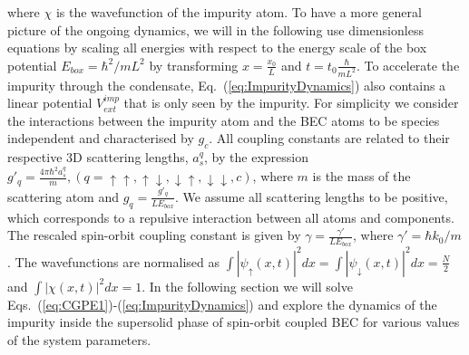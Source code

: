 \documentclass[12pt]{iopart}
\begin{document}
where $\chi$ is the wavefunction  of the impurity atom. To have a more general picture of the ongoing dynamics, we will in the following use dimensionless equations by scaling all energies with respect to the energy scale of the box potential $E_{box}=\hbar^2 /mL^2$ by transforming $x=\frac{x_0}{L}$ and $t = t_0\frac{\hbar}{mL^2}$.
To accelerate the impurity through the condensate, Eq.~(\ref{eq:ImpurityDynamics}) also contains a linear potential $V_{ext}^{imp}$ that is only seen by the impurity. For simplicity we consider the interactions between the impurity atom and the BEC atoms to be species independent and characterised by $g_{c}$. All coupling constants are related to their respective 3D scattering lengths, $a_s^{q}$, by the expression $g'_{q}=\frac{4\pi\hbar^2a_s^{q}}{m}, (q=\uparrow\uparrow,\uparrow\downarrow,\downarrow\uparrow,\downarrow\downarrow,c)$, where $m$ is the mass of the scattering atom and $g_{q}=\frac{g'_{q}}{L E_{{box}}}$. We assume all scattering lengths to be positive, which corresponds to a repulsive interaction between all atoms and components. The rescaled spin-orbit coupling constant is given by $\gamma=\frac{\gamma'}{L E_{box}}$, where $\gamma'=\hbar k_0/m$.
The wavefunctions are normalised as $\int |\psi_{\uparrow}(x,t)|^2 dx=\int |\psi_{\downarrow}(x,t)|^2 dx=\frac{N}{2}$ and $\int |\chi(x,t)|^2 dx=1$. In the following section we will solve Eqs.~(\ref{eq:CGPE1})-(\ref{eq:ImpurityDynamics}) and explore the dynamics of the impurity inside the supersolid phase of spin-orbit coupled BEC for various values of the system parameters.

\end{document}
